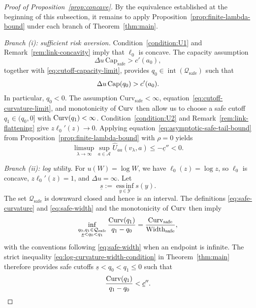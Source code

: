 \begin{proof}[Proof of Proposition~\ref{prop:concave}]
By the equivalence established at the beginning of this subsection, it remains
to apply Proposition~\ref{prop:finite-lambda-bound} under each branch of
Theorem~\ref{thm:main}.

\emph{Branch (i): sufficient risk aversion.}
Condition~\eqref{condition:U1} and Remark~\ref{rem:link-concavity} imply that
$\ell_0$ is concave.  The capacity assumption
\[
    \Delta u\,\mathrm{Cap}_{\mathrm{safe}}>c'(a_0),
\]
together with \eqref{eq:cutoff-capacity-limit}, provides
$q_0\in\operatorname{int}(\mathcal Q_{\mathrm{safe}})$ such that
\[
    \Delta u\,\mathrm{Cap}(q_0)>c'(a_0).
\]
In particular, $q_0<0$.  The assumption
$\mathrm{Curv}_{\mathrm{safe}}<\infty$, equation~\eqref{eq:cutoff-curvature-limit}, and monotonicity of $\mathrm{Curv}$ then allow us
to choose a safe cutoff $q_1\in(q_0,0]$ with $\mathrm{Curv}(q_1)<\infty$.
Condition~\eqref{condition:U2} and Remark~\ref{rem:link-flattening} give
$z\ell_0'(z)\to0$.  Applying equation~\eqref{eq:asymptotic-safe-tail-bound} from Proposition~\ref{prop:finite-lambda-bound} with $\rho=0$ yields
\[
 \limsup_{\lambda\to\infty}\sup_{a\in\mathcal A}
 \widehat U_{aa}(v_\lambda,a)
 \leq-\underline c''<0.
\]

\emph{Branch (ii): log utility.}
For $u(W)=\log W$, we have $\ell_0(z)=\log z$, so $\ell_0$ is
concave, $z\ell_0'(z)=1$, and $\Delta u=\infty$.
Let
\[
    \underline s:=\operatorname*{ess\,inf}_{y\in\mathcal Y}s(y).
\]
The set $\mathcal Q_{\mathrm{safe}}$ is downward closed and hence is an
interval.  The definitions \eqref{eq:safe-curvature} and
\eqref{eq:safe-width} and the monotonicity of $\mathrm{Curv}$ then imply
\begin{equation}
    \inf_{\substack{q_0,q_1\in\mathcal Q_{\mathrm{safe}}\\
                    \underline s<q_0<q_1}}
    \frac{\mathrm{Curv}(q_1)}{q_1-q_0}
    =
    \frac{\mathrm{Curv}_{\mathrm{safe}}}
         {\mathrm{Width}_{\mathrm{safe}}},
    \label{eq:cutoff-ratio-limit}
\end{equation}
with the conventions following \eqref{eq:safe-width} when an endpoint
is infinite.  The strict inequality
\eqref{eq:log-curvature-width-condition} in Theorem~\ref{thm:main} therefore
provides safe cutoffs $\underline s<q_0<q_1\leq0$ such that
\begin{equation}
    \frac{\mathrm{Curv}(q_1)}{q_1-q_0}<\underline c''.
    \label{eq:log-cutoff-ratio}
\end{equation}


\end{proof}
